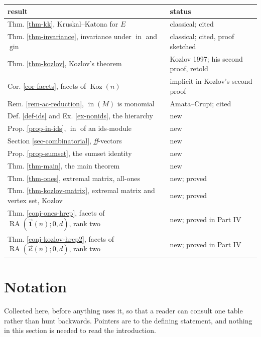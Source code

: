\documentclass[11pt, a4paper, abstract=yes]{scrartcl}
\theoremstyle{definition}
\theoremstyle{remark}
\theoremstyle{plain}
\newcommand{\Koz}{\operatorname{Koz}}
\newcommand{\RA}{\operatorname{RA}}
\newcommand{\kozvec}{\vec\kappa}
\newcommand{\onesvec}{\vec{\mathbf 1}}
\newcommand{\inn}{\operatorname{in}}
\newcommand{\gin}{\operatorname{gin}}
\begin{document}
\begin{center}
\small
\begin{tabular}{ll}
result & status\\
\hline
Thm. \ref{thm-kk}, Kruskal--Katona for \(E\) & classical; cited\\
Thm. \ref{thm-invariance}, invariance under \(\inn\) and \(\gin\) & classical; cited, proof sketched\\
Thm. \ref{thm-kozlov}, Kozlov's theorem & Kozlov 1997; his second proof, retold\\
Cor. \ref{cor-facets}, facets of \(\Koz(n)\) & implicit in Kozlov's second proof\\
Rem. \ref{rem-ac-reduction}, \(\inn(M)\) is monomial & Amata--Crupi; cited\\
Def. \ref{def-ids} and Ex. \ref{ex-nonids}, the hierarchy & new\\
Prop. \ref{prop-in-ids}, \(\inn\) of an ids-module & new\\
Section \ref{sec-combinatorial}, \emph{ff}-vectors & new\\
Prop. \ref{prop-sumset}, the sumset identity & new\\
Thm. \ref{thm-main}, the main theorem & new\\
Thm. \ref{thm-ones}, extremal matrix, all-ones & new; proved\\
Thm. \ref{thm-kozlov-matrix}, extremal matrix and vertex set, Kozlov & new; proved\\
Thm. \ref{conj-ones-hrep}, facets of \(\RA(\onesvec(n);0,d)\), rank two & new; proved in Part IV\\
Thm. \ref{conj-kozlov-hrep2}, facets of \(\RA(\kozvec(n);0,d)\), rank two & new; proved in Part IV\\
\end{tabular}

\end{center}
\section{Notation}
\label{sec-notation}
Collected here, before anything uses it, so that a reader can consult one table rather than hunt
backwards. Pointers are to the defining statement, and nothing in this section is needed to read
the introduction.
\end{document}
